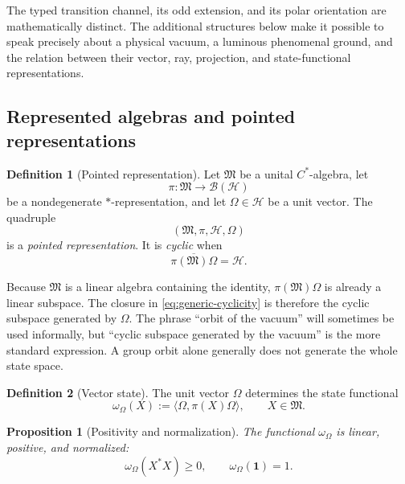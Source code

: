 \documentclass[11pt,reqno]{scrartcl}
\newcommand{\idop}{\mathbf 1}
\newcommand{\inner}[2]{\langle #1,#2\rangle}
\theoremstyle{plain}
\newtheorem{proposition}[proposition]{Proposition}
\theoremstyle{definition}
\newtheorem{definition}[definition]{Definition}
\theoremstyle{remark}
\begin{document}
The typed transition channel, its odd extension, and its polar orientation are
mathematically distinct.  The additional structures below make it possible to
speak precisely about a physical vacuum, a luminous phenomenal ground, and the
relation between their vector, ray, projection, and state-functional
representations.

\subsection{Represented algebras and pointed representations}

\begin{definition}[Pointed representation]
\label{def:pointed-representation}
Let $\mathfrak M$ be a unital $C^*$-algebra, let
\begin{equation}
  \pi:\mathfrak M\longrightarrow\mathcal B(\mathscr H)
\end{equation}
be a nondegenerate $*$-representation, and let $\Omega\in\mathscr H$ be a
unit vector.  The quadruple
\begin{equation}
  (\mathfrak M,\pi,\mathscr H,\Omega)
\end{equation}
is a \emph{pointed representation}.  It is \emph{cyclic} when
\begin{equation}
  \overline{\pi(\mathfrak M)\Omega}=\mathscr H.
  \label{eq:generic-cyclicity}
\end{equation}
\end{definition}

Because $\mathfrak M$ is a linear algebra containing the identity,
$\pi(\mathfrak M)\Omega$ is already a linear subspace.  The closure in
\eqref{eq:generic-cyclicity} is therefore the cyclic subspace generated by
$\Omega$.  The phrase ``orbit of the vacuum'' will sometimes be used
informally, but ``cyclic subspace generated by the vacuum'' is the more
standard expression.  A group orbit alone generally does not generate the
whole state space.

\begin{definition}[Vector state]
\label{def:vector-state}
The unit vector $\Omega$ determines the state functional
\begin{equation}
  \omega_{\Omega}(X)
  :=\inner{\Omega}{\pi(X)\Omega},
  \qquad X\in\mathfrak M.
  \label{eq:generic-vector-state}
\end{equation}
\end{definition}

\begin{proposition}[Positivity and normalization]
\label{prop:vector-state-positive}
The functional $\omega_{\Omega}$ is linear, positive, and normalized:
\begin{equation}
  \omega_{\Omega}(X^*X)\geq0,
  \qquad
  \omega_{\Omega}(\idop)=1.
\end{equation}
\end{proposition}
\end{document}
